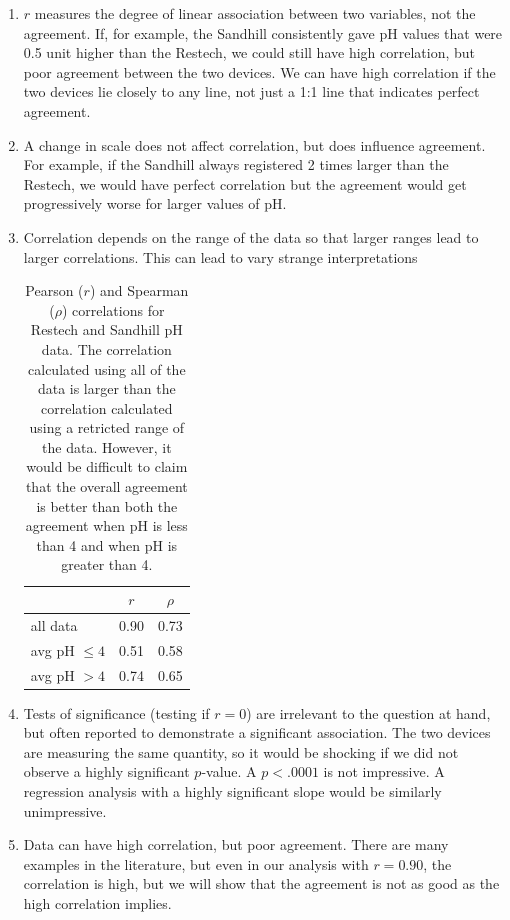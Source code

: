   \begin{enumerate}
   \item $r$ measures the degree of linear association between two
     variables, not the agreement.  If, for example, the Sandhill
     consistently gave pH values that were 0.5 unit higher than the
     Restech, we could still have high correlation, but poor agreement
     between the two devices.  We can have high correlation if the two
     devices lie closely to any line, not just a 1:1 line that
     indicates perfect agreement.  
   \item A change in scale does not affect correlation, but does
     influence agreement. For example, if the Sandhill always
     registered 2 times larger than the Restech, we would have perfect
     correlation but the agreement would get progressively worse for
     larger values of pH. 
   \item Correlation depends on the range of the data so that larger
     ranges lead to larger correlations.  This can lead to vary
     strange interpretations 

\begin{table}[!h]
\begin{center}
\begin{tabular}{l|cc}
 & $r$ & $\rho$ \\ \hline
all data & 0.90 & 0.73 \\ 
avg pH $\leq 4$ & 0.51 & 0.58 \\ 
avg pH $> 4$ & 0.74 & 0.65
\end{tabular}
\caption{Pearson ($r$) and Spearman ($\rho$) correlations for Restech and Sandhill pH data.  The correlation calculated using all of the data is larger than the correlation calculated using a retricted range of the data.  However, it would be difficult to claim that the overall agreement is better than both the agreement when pH is less than 4 and when pH is greater than 4.}
\end{center}
\end{table}

\item Tests of significance (testing if $r=0$) are irrelevant to the
  question at hand, but often reported to demonstrate a significant
  association.  The two devices are measuring the same quantity, so it
  would be shocking if we did not observe a highly significant
  $p$-value. A $p < .0001$ is not impressive.  A regression analysis
  with a highly significant slope would be similarly unimpressive. 
\item Data can have high correlation, but poor agreement.  There are
  many examples in the literature, but even in our analysis with $r =
  0.90$, the correlation is high, but we will show that the agreement
  is not as good as the high correlation implies. \
  \end{enumerate}
\ei

